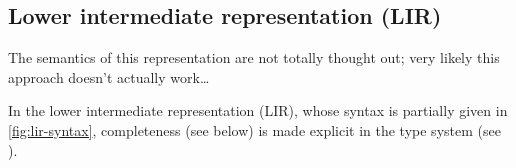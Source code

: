 \documentclass[index.tex]{subfiles}
\begin{document}
\newcommand{\EWrapIntoNI}[1]{\ensuremath{\SyWrap^{\CNI}~ #1}}
\newcommand{\EWrapIntoII}[1]{\ensuremath{\SyWrap^{\CII}~ #1}}
\newcommand{\EEmbed}[1]{\ensuremath{\SyEmbed~ #1}}
\newcommand{\EProj}[2]{\ensuremath{\SyProj[#2]~ #1}}

\newcommand{\EPlus}[2]{\ensuremath{#1 \SyPlus #2}}
\newcommand{\ETimes}[2]{\ensuremath{#1 \SyTimes #2}}
\newcommand{\EFPlus}[2]{\ensuremath{#1 \SyFPlus #2}}
\newcommand{\EFTimes}[2]{\ensuremath{#1 \SyFTimes #2}}

\newcommand{\ETrue}{\ensuremath{\SyTrue}}
\newcommand{\EAnd}[2]{\ensuremath{#1 \SyAnd #2}}
\newcommand{\EOr}[2]{\ensuremath{#1 \SyOr #2}}

\newcommand{\EPair}[2]{\ensuremath{(#1, #2)}}
\newcommand{\EProjL}[1]{\ensuremath{\SyProjL~ #1}}
\newcommand{\EProjR}[1]{\ensuremath{\SyProjR~ #1}}

\newcommand{\EFun}[3]{\ensuremath{\SyFun #1 : #2 \SyDot~ #3}}
\newcommand{\EAp}[2]{\ensuremath{#1 ~#2}}

\newcommand{\EEHole}[2]{\ensuremath{\SyEHole{#1}{#2}}}

\newcommand{\EVarNamed}[2]{\ensuremath{t_{#1}^{{\color{gray}#2}}}}

\subsection{Lower intermediate representation (LIR)}
\label{sec:lir}

\begin{note}
  The semantics of this representation are not totally thought out; very likely this approach
  doesn't actually work\ldots
\end{note}

In the lower intermediate representation (LIR), whose syntax is partially given in
\cref{fig:lir-syntax}, completeness (see below) is made explicit in the type system
(see ).
\end{document}
